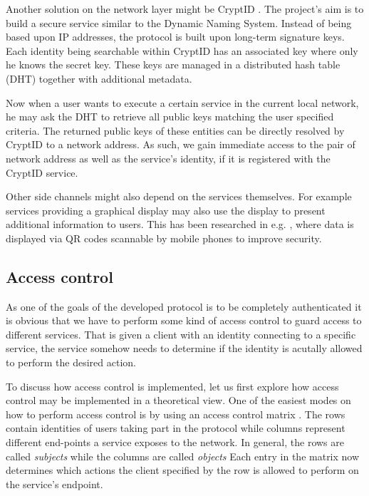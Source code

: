 Another solution on the network layer might be CryptID \cite{malchow2015cryptid}.
The project's aim is to build a secure service similar to the Dynamic Naming System.
Instead of being based upon IP addresses, the protocol is built upon long-term signature keys.
Each identity being searchable within CryptID has an associated key where only he knows the secret key.
These keys are managed in a distributed hash table (DHT) together with additional metadata.

Now when a user wants to execute a certain service in the current local network, he may ask the DHT to retrieve all public keys matching the user specified criteria.
The returned public keys of these entities can be directly resolved by CryptID to a network address.
As such, we gain immediate access to the pair of network address as well as the service's identity, if it is registered with the CryptID service.

Other side channels might also depend on the services themselves.
For example services providing a graphical display may also use the display to present additional information to users.
This has been researched in e.g. \cite{mccune2005seeing,saxena2006secure}, where data is displayed via QR codes scannable by mobile phones to improve security.

\subsection{Access control}

As one of the goals of the developed protocol is to be completely authenticated it is obvious that we have to perform some kind of access control to guard access to different services.
That is given a client with an identity connecting to a specific service, the service somehow needs to determine if the identity is acutally allowed to perform the desired action.

To discuss how access control is implemented, let us first explore how access control may be implemented in a theoretical view.
One of the easiest modes on how to perform access control is by using an access control matrix \cite{lampson1974protection,tanenbaum2014modern}.
The rows contain identities of users taking part in the protocol while columns represent different end-points a service exposes to the network.
In general, the rows are called \emph{subjects} while the columns are called \emph{objects}
Each entry in the matrix now determines which actions the client specified by the row is allowed to perform on the service's endpoint.

